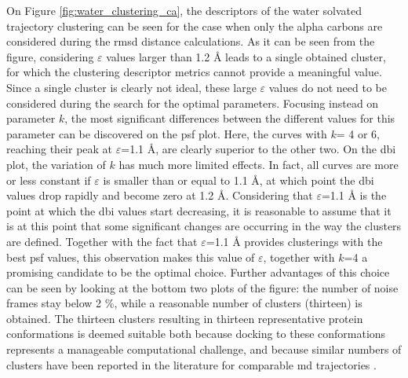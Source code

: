 On Figure \ref{fig:water_clustering_ca}, the descriptors of the water solvated trajectory clustering can be seen for the case when only the alpha carbons are considered during the \gls{rmsd} distance calculations.
As it can be seen from the figure, considering $\varepsilon$ values larger than 1.2 \AA{} leads to a single obtained cluster, for which the clustering descriptor metrics cannot provide a meaningful value.
Since a single cluster is clearly not ideal, these large $\varepsilon$ values do not need to be considered during the search for the optimal parameters.
Focusing instead on parameter $k$, the most significant differences between the different values for this parameter can be discovered on the \gls{psf} plot.
Here, the curves with $k$= 4 or 6, reaching their peak at $\varepsilon$=1.1 \AA{}, are clearly superior to the other two.
On the \gls{dbi} plot, the variation of $k$ has much more limited effects.
In fact, all curves are more or less constant if $\varepsilon$ is smaller than or equal to 1.1 \AA{}, at which point the \gls{dbi} values drop rapidly and become zero at 1.2 \AA{}.
Considering that $\varepsilon$=1.1 \AA{} is the point at which the \gls{dbi} values start decreasing, it is reasonable to assume that it is at this point that some significant changes are occurring in the way the clusters are defined.
Together with the fact that $\varepsilon$=1.1 \AA{} provides clusterings with the best \gls{psf} values, this observation makes this value of $\varepsilon$, together with $k$=4 a promising candidate to be the optimal choice.
Further advantages of this choice can be seen by looking at the bottom two plots of the figure: the number of noise frames stay below 2 \%, while a reasonable number of clusters (thirteen) is obtained.
The thirteen clusters resulting in thirteen representative protein conformations is deemed suitable both because docking to these conformations represents a manageable computational challenge, and because similar numbers of clusters have been reported in the literature for comparable \gls{md} trajectories \cite{24clusters-vina,clusters_vina2}.
